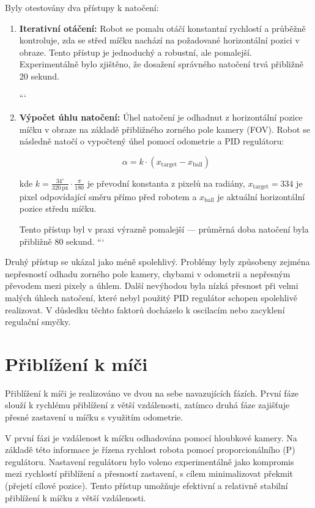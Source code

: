 \documentclass[12pt, a4paper, oneside]{article}
\begin{document}
Byly otestovány dva přístupy k natočení:

\begin{enumerate}
\item \textbf{Iterativní otáčení:} Robot se pomalu otáčí konstantní rychlostí a průběžně kontroluje, zda se střed míčku nachází na požadované horizontální pozici v obraze. Tento přístup je jednoduchý a robustní, ale pomalejší. Experimentálně bylo zjištěno, že dosažení správného natočení trvá přibližně 20 sekund.

```
\item \textbf{Výpočet úhlu natočení:} Úhel natočení je odhadnut z horizontální pozice míčku v obraze na základě přibližného zorného pole kamery (FOV). Robot se následně natočí o vypočtený úhel pomocí odometrie a PID regulátoru:

\begin{equation}
    \alpha = k \cdot (x_{\text{target}} - x_{\text{ball}})
\end{equation}

kde $k = \frac{34^\circ}{320 \,\text{px}} \cdot \frac{\pi}{180}$ je převodní konstanta z pixelů na radiány, $x_{\text{target}} = 334$ je pixel odpovídající směru přímo před robotem a $x_{\text{ball}}$ je aktuální horizontální pozice středu míčku.

Tento přístup byl v praxi výrazně pomalejší — průměrná doba natočení byla přibližně 80 sekund.
```

\end{enumerate}

Druhý přístup se ukázal jako méně spolehlivý. Problémy byly způsobeny zejména nepřesností odhadu zorného pole kamery, chybami v odometrii a nepřesným převodem mezi pixely a úhlem. Další nevýhodou byla nízká přesnost při velmi malých úhlech natočení, které nebyl použitý PID regulátor schopen spolehlivě realizovat. V důsledku těchto faktorů docházelo k oscilacím nebo zacyklení regulační smyčky.

\section{Přiblížení k míči}
\label{sec:approach_ball}

Přiblížení k míči je realizováno ve dvou na sebe navazujících fázích. První fáze slouží k rychlému přiblížení z větší vzdálenosti, zatímco druhá fáze zajišťuje přesné zastavení u míčku s využitím odometrie.

V první fázi je vzdálenost k míčku odhadována pomocí hloubkové kamery. Na základě této informace je řízena rychlost robota pomocí proporcionálního (P) regulátoru. Nastavení regulátoru bylo voleno experimentálně jako kompromis mezi rychlostí přiblížení a přesností zastavení, s cílem minimalizovat překmit (přejetí cílové pozice). Tento přístup umožňuje efektivní a relativně stabilní přiblížení k míčku z větší vzdálenosti.
\end{document}
